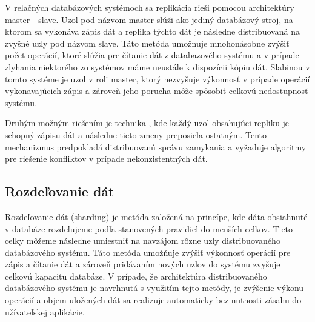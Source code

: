 \documentclass[11pt,twoside,a4paper]{book}
\begin{document}


V relačných databázových systémoch sa replikácia rieši pomocou architektúry master - slave. Uzol pod názvom master slúži ako jediný databázový stroj, na ktorom sa vykonáva zápis dát a replika týchto dát je následne distribuovaná na zvyšné uzly pod názvom slave. Táto metóda umožnuje mnohonásobne zvýšiť počet operácií, ktoré slúžia pre čítanie dát z databazového systému a v prípade zlyhania niektorého zo systémov máme neustále k dispozícii kópiu dát. Slabinou v tomto systéme je uzol v roli master, ktorý nezvyšuje výkonnosť v prípade operácií vykonavajúcich zápis a zároveň jeho porucha môže spôsobiť celkovú nedostupnosť systému.

Druhým možným riešením je technika , kde každý uzol obsahujúci repliku je schopný zápisu dát a následne tieto zmeny preposiela ostatným. Tento mechanizmus predpokladá distribuovanú správu zamykania a vyžaduje algoritmy pre riešenie konfliktov v prípade nekonzistentných dát.


\subsection{Rozdeľovanie dát}

Rozdeľovanie dát (sharding) je metóda založená na princípe, kde dáta obsiahnuté v databáze rozdeľujeme podľa stanovených pravidiel do menších celkov. Tieto celky môžeme následne umiestniť na navzájom rôzne uzly distribuovaného databázového systému. Táto metóda umožňuje zvýšiť výkonnosť operácií pre zápis a čítanie dát a zároveň pridávaním nových uzlov do systému zvyšuje celkovú kapacitu databáze. V prípade, že
architektúra distribuovaného databázového systému je navrhnutá s využitím tejto metódy, je zvýšenie výkonu operácií a objem uložených dát sa realizuje automaticky bez nutnosti zásahu do užívateľskej aplikácie. 
\end{document}
